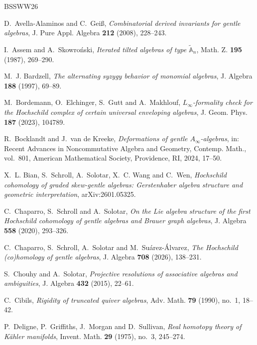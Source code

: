 \documentclass[11pt,a4paper,reqno]{amsart}
\theoremstyle{plain}
\theoremstyle{definition}
\numberwithin{equation}{section}
\begin{document}
	\begin{thebibliography}{BSSWW26}
		
		D.~Avella-Alaminos and C.~Gei\ss,
		\emph{Combinatorial derived invariants for gentle algebras},
		J. Pure Appl. Algebra \textbf{212} (2008), 228--243.
		
		I.~Assem and A.~Skowro\'nski,
		\emph{Iterated tilted algebras of type $\widetilde{\mathbb A}_n$},
		Math. Z. \textbf{195} (1987), 269--290.
		
		M.~J. Bardzell,
		\emph{The alternating syzygy behavior of monomial algebras},
		J. Algebra \textbf{188} (1997), 69--89.
		
		M.~Bordemann, O.~Elchinger, S.~Gutt and A.~Makhlouf,
		\emph{$L_\infty$-formality check for the Hochschild complex of certain universal enveloping algebras},
		J. Geom. Phys. \textbf{187} (2023), 104789.
		
		R.~Bocklandt and J.~van de Kreeke,
		\emph{Deformations of gentle $A_\infty$-algebras},
		in: Recent Advances in Noncommutative Algebra and Geometry,
		Contemp. Math., vol.~801,
		American Mathematical Society, Providence, RI, 2024, 17--50.
		
		X.~L. Bian, S.~Schroll, A.~Solotar, X.~C. Wang and C.~Wen,
		\emph{Hochschild cohomology of graded skew-gentle algebras: Gerstenhaber algebra structure and geometric interpretation},
		arXiv:2601.05325.
		
		C.~Chaparro, S.~Schroll and A.~Solotar,
		\emph{On the Lie algebra structure of the first Hochschild cohomology of
			gentle algebras and Brauer graph algebras},
		J. Algebra \textbf{558} (2020), 293--326.
		
		C.~Chaparro, S.~Schroll, A.~Solotar and M.~Su\'arez-\'Alvarez,
		\emph{The Hochschild (co)homology of gentle algebras},
		J. Algebra \textbf{708} (2026), 138--231.
		
		S.~Chouhy and A.~Solotar,
		\emph{Projective resolutions of associative algebras and ambiguities},
		J. Algebra \textbf{432} (2015), 22--61.
		
		C.~Cibils,
		\emph{Rigidity of truncated quiver algebras},
		Adv. Math. \textbf{79} (1990), no.~1, 18--42.
		
		P.~Deligne, P.~Griffiths, J.~Morgan and D.~Sullivan,
		\emph{Real homotopy theory of K\"ahler manifolds},
		Invent. Math. \textbf{29} (1975), no.~3, 245--274.
		

\end{thebibliography}
\end{document}
